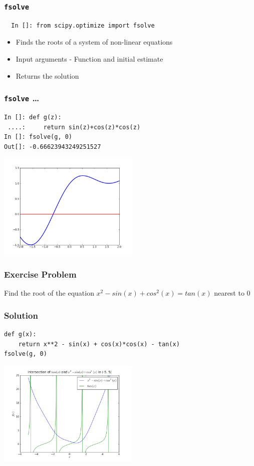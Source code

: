 \documentclass[14pt,compress]{beamer}
\newcommand{\typ}[1]{\lstinline{#1}}
\begin{document}
\begin{frame}[fragile]
\frametitle{\typ{fsolve}}
\begin{small}
\begin{lstlisting}
  In []: from scipy.optimize import fsolve
\end{lstlisting}
\end{small}
\begin{itemize}
\item Finds the roots of a system of non-linear equations
\item Input arguments - \alert{Function} and initial estimate
\item Returns the solution
\end{itemize}
\end{frame}

\begin{frame}[fragile]
\frametitle{\typ{fsolve} \ldots}
\begin{lstlisting}
In []: def g(z):
 ....:     return sin(z)+cos(z)*cos(z)
In []: fsolve(g, 0)
Out[]: -0.66623943249251527
\end{lstlisting}
\begin{center}
\includegraphics[height=2in, interpolate=true]{data/fsolve}    
\end{center}
\end{frame}

\begin{frame}[fragile]
  \frametitle{Exercise Problem}
  Find the root of the equation $x^2 - sin(x) + cos^2(x) = tan(x)$ nearest to $0$
\end{frame}

\begin{frame}[fragile]
  \frametitle{Solution}
  \begin{small}
  \begin{lstlisting}
def g(x):
    return x**2 - sin(x) + cos(x)*cos(x) - tan(x)
fsolve(g, 0)
  \end{lstlisting}
  \end{small}
  \begin{center}
\includegraphics[height=2in, interpolate=true]{data/fsolve_tanx}
  \end{center}
\end{frame}
\end{document}
